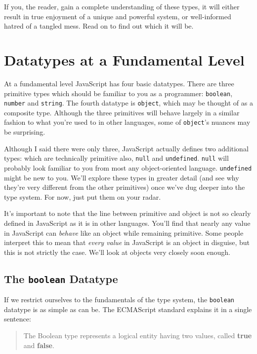\documentclass[11pt,letter]{book}
\begin{document}
    If you, the reader, gain a complete understanding of these types, it will either result 
    in true enjoyment of a unique and powerful system, or well-informed hatred of a tangled 
    mess. Read on to find out which it will be.
    
    \section{Datatypes at a Fundamental Level}
    At a fundamental level JavaScript has four basic datatypes. There are three primitive 
    types which should be familiar to you as a programmer: \texttt{boolean}, \texttt{number} 
    and \texttt{string}. The fourth datatype is \texttt{object}, which may be thought of as a 
    composite type. Although the three primitives will behave largely in a similar 
    fashion to what you're used to in other languages, some of \texttt{object}'s nuances 
    may be surprising.
    
    Although I said there were only three, JavaScript actually defines two additional types: which
    are technically primitive also, \texttt{null} and \texttt{undefined}. \texttt{null} will 
    probably look familiar to you from most any object-oriented language. \texttt{undefined} might 
    be new to you. We'll explore these types in greater detail (and see why they're very different 
    from the other primitives) once we've dug deeper into the type system. For now, just put them on 
    your radar.
    
    It's important to note that the line between primitive and object is not so clearly defined
    in JavaScript as it is in other languages. You'll find that nearly any value in JavaScript can
    \emph{behave} like an object while remaining primitive. Some people interpret this to mean that
    \emph{every value} in JavaScript is an object in disguise, but this is not strictly the case.
    We'll look at objects very closely soon enough.
    
    \subsection{The \texttt{boolean} Datatype}
    If we restrict ourselves to the fundamentals of the type system, the \texttt{boolean} 
    datatype is as simple as can be. The ECMAScript standard explains it in a single sentence:
    
    \begin{quote}
        The Boolean type represents a logical entity having two values, called \textbf{true}
        and \textbf{false}.
    \end{quote}
    
\end{document}
